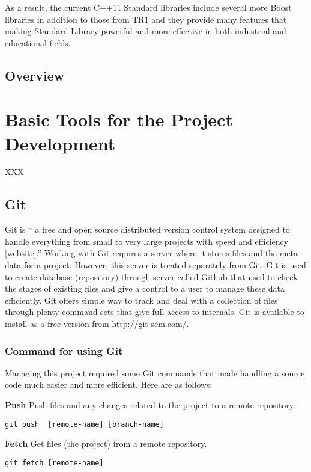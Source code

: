 \documentclass[11pt]{report}
\begin{document}
As a result, the current C++11 Standard libraries include several more Boost libraries in addition to those from TR1 and they provide many features that making Standard Library powerful and more effective in both industrial and educational fields.

\section{Overview}
\label{sec: Overview}
 
\chapter{Basic Tools for the Project Development}
\label{cha: tools}

XXX

\section{Git}
\label{sec: Git}
Git is “ a free and open source distributed version control system designed to handle everything from small to very large projects with speed and efficiency [website].”  Working with Git requires a server where it stores files and the meta-data for a project. However, this server is treated separately from Git.  Git is used to create database (repository) through server called Github that used to check the stages of existing files and give a control to a user to manage these data efficiently. Git offers simple way to track and deal with a collection of files through plenty command sets that give full access to internals. Git is available to install as a free version from  \url{http://git-scm.com/}.


\subsection{Command for using Git}
\label{subsec: Command for using Git}
Managing this project required some Git commands that made handling a source code much easier and more efficient. Here are as follows:

\textbf{Push} Push files and any changes related to the project  to a remote repository.
\begin{verbatim}
git push  [remote-name] [branch-name]
\end{verbatim}

\textbf{Fetch} Get files (the project) from a remote repository.
\begin{verbatim}
git fetch [remote-name]
\end{verbatim}
\end{document}
